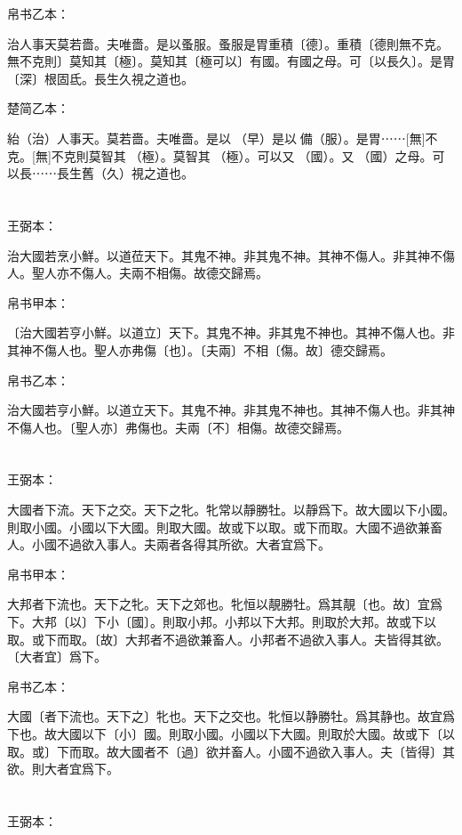 \documentclass[a5paper]{ctexbook}
\begin{document}
    帛书乙本：

    治人事天莫若嗇。夫唯嗇。是以蚤服。蚤服是胃重積〔德〕。重積〔德則無不克。無不克則〕莫知其〔極〕。莫知其〔極可以〕有國。有國之母。可〔以長久〕。是胃〔深〕根固氐。長生久視之道也。

    楚简乙本：

    紿（治）人事天。莫若嗇。夫唯嗇。是以󶵙（早）是以󶵙備（服）。是胃⋯⋯[無]不克。[無]不克則莫智其𠄨（極）。莫智其𠄨（極）。可以又󼷜（國）。又󼷜（國）之母。可以長⋯⋯長生舊（久）視之道也。

    \chapter{}
    王弼本：

    治大國若烹小鮮。以道莅天下。其鬼不神。非其鬼不神。其神不傷人。非其神不傷人。聖人亦不傷人。夫兩不相傷。故德交歸焉。

    
    帛书甲本：

    〔治大國若亨小鮮。以道立〕天下。其鬼不神。非其鬼不神也。其神不傷人也。非其神不傷人也。聖人亦弗傷〔也〕。〔夫兩〕不相〔傷。故〕德交歸焉。

    帛书乙本：

    治大國若亨小鮮。以道立天下。其鬼不神。非其鬼不神也。其神不傷人也。非其神不傷人也。〔聖人亦〕弗傷也。夫兩〔不〕相傷。故德交歸焉。

    \chapter{}
    王弼本：

    大國者下流。天下之交。天下之牝。牝常以靜勝牡。以靜爲下。故大國以下小國。則取小國。小國以下大國。則取大國。故或下以取。或下而取。大國不過欲兼畜人。小國不過欲入事人。夫兩者各得其所欲。大者宜爲下。

    
    帛书甲本：

    大邦者下流也。天下之牝。天下之郊也。牝恒以靚勝牡。爲其靚〔也。故〕宜爲下。大邦〔以〕下小〔國〕。則取小邦。小邦以下大邦。則取於大邦。故或下以取。或下而取。〔故〕大邦者不過欲兼畜人。小邦者不過欲入事人。夫皆得其欲。〔大者宜〕爲下。

    帛书乙本：

    大國〔者下流也。天下之〕牝也。天下之交也。牝恒以静勝牡。爲其静也。故宜爲下也。故大國以下〔小〕國。則取小國。小國以下大國。則取於大國。故或下〔以取。或〕下而取。故大國者不〔過〕欲并畜人。小國不過欲入事人。夫〔皆得〕其欲。則大者宜爲下。

    \chapter{}
    王弼本：
\end{document}
